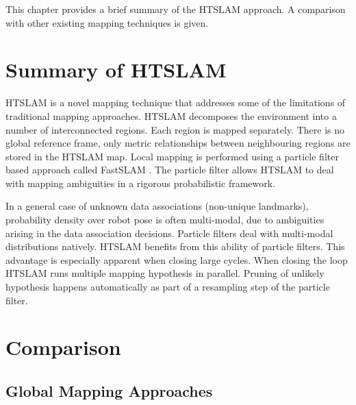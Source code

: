 This chapter provides a brief summary of the HTSLAM approach. A comparison
with other existing mapping techniques is given. 


\section{Summary of HTSLAM}


HTSLAM is a novel mapping technique that addresses some of the
limitations of traditional mapping approaches. HTSLAM decomposes the
environment into a number of interconnected regions. Each region is
mapped separately. There is no global reference frame, only
metric relationships between neighbouring regions are stored in the
HTSLAM map. Local mapping is performed using a particle filter based
approach called FastSLAM \cite{fastslam, fastslam2}. The particle filter
allows HTSLAM to deal with mapping ambiguities in a rigorous
probabilistic framework.


In a general case of unknown data associations (non-unique landmarks),
probability density over robot pose is often multi-modal, due to
ambiguities arising in the data association decisions. Particle filters
deal with multi-modal distributions natively. HTSLAM benefits from this
ability of particle filters. This advantage is especially apparent when
closing large cycles. When closing the loop HTSLAM runs multiple mapping
hypothesis in parallel. Pruning of unlikely hypothesis happens
automatically as part of a resampling step of the particle filter.



\section{Comparison}

\subsection{Global Mapping Approaches}


